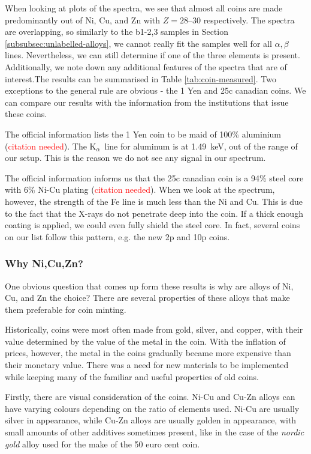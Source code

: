 \documentclass[11pt,a4paper,twoside,onecolumn]{article}
\newcommand{\reminder}[1]{\textcolor{red}{#1}}
\newcommand{\Kalpha}{$\mathrm{K}_\alpha$~}
\begin{document}
When looking at plots of the spectra, we see that almost all coins are made predominantly out of Ni, Cu, and Zn with $Z=\numrange{28}{30}$ respectively. The spectra are overlapping, so similarly to the b1-2,3 samples in Section \ref{subsubsec:unlabelled-alloys}, we cannot really fit the samples well for all $\alpha, \beta$ lines. Nevertheless, we can still determine if one of the three elements is present. Additionally, we note down any additional features of the spectra that are of interest.The results can be summarised in Table \ref{tab:coin-measured}. Two exceptions to the general rule are obvious - the 1 Yen and 25c canadian coins. We can compare our results with the information from the institutions that issue these coins.

The official information lists the 1 Yen coin to be maid of 100\% aluminium (\reminder{citation needed}). The \Kalpha line for aluminum is at \qty{1.49}{keV}, out of the range of our setup. This is the reason we do not see any signal in our spectrum.

The official information informs us that the 25c canadian coin is a 94\% steel core with 6\% Ni-Cu plating (\reminder{citation needed}). When we look at the spectrum, however, the strength of the Fe line is much less than the Ni and Cu. This is due to the fact that the X-rays do not penetrate deep into the coin. If a thick enough coating is applied, we could even fully shield the steel core. In fact, several coins on our list follow this pattern, e.g. the new 2p and 10p coins.

\subsubsection{Why Ni,Cu,Zn?}
One obvious question that comes up form these results is why are alloys of Ni, Cu, and Zn the choice? There are several properties of these alloys that make them preferable for coin minting.

Historically, coins were most often made from gold, silver, and copper, with their value determined by the value of the metal in the coin. With the inflation of prices, however, the metal in the coins gradually became more expensive than their monetary value. There was a need for new materials to be implemented while keeping many of the familiar and useful properties of old coins.

Firstly, there are visual consideration of the coins. Ni-Cu and Cu-Zn alloys can have varying colours depending on the ratio of elements used. Ni-Cu are usually silver in appearance, while Cu-Zn alloys are usually golden in appearance, with small amounts of other additives sometimes present, like in the case of the \emph{nordic gold} alloy used for the make of the 50 euro cent coin.
\end{document}
